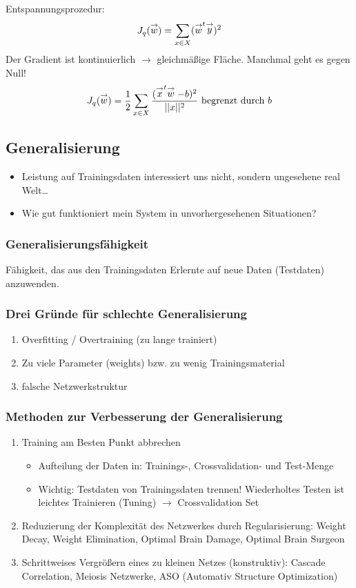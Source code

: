 Entspannungsprozedur: $$J_q(\stackrel{\to}{w}) = \sum\limits_{x \in X} (\stackrel{\to}{w}^t \stackrel{\to}{y})^2$$
Der Gradient ist kontinuierlich $\to$ gleichmäßige Fläche. Manchmal geht es gegen Null!
$$J_q(\stackrel{\to}{w}) = \frac{1}{2} \sum\limits_{x \in X} \frac{(\stackrel{\to}{x}^t\stackrel{\to}{w} - b)^2}{||x||^2} \textrm{ begrenzt durch } b$$

\subsection{Generalisierung}

\begin{itemize}
\item Leistung auf Trainingsdaten interessiert uns nicht, sondern ungesehene real Welt\dots
\item Wie gut funktioniert mein System in unvorhergesehenen Situationen?
\end{itemize}

\subsubsection*{Generalisierungsfähigkeit}

Fähigkeit, das aus den Trainingsdaten Erlernte auf neue Daten (Testdaten) anzuwenden.

\subsubsection*{Drei Gründe für schlechte Generalisierung}
\begin{enumerate}
\item Overfitting / Overtraining (zu lange trainiert)
\item Zu viele Parameter (weights) bzw. zu wenig Trainingsmaterial
\item falsche Netzwerkstruktur
\end{enumerate}
\subsubsection*{Methoden zur Verbesserung der Generalisierung}

\begin{enumerate}
\item Training am Besten Punkt abbrechen
\begin{itemize}
\item Aufteilung der Daten in: Trainings-, Crossvalidation- und Test-Menge
\item Wichtig: Testdaten von Trainingsdaten trennen! Wiederholtes Testen ist leichtes Trainieren (Tuning) $\to$ Crossvalidation Set
\end{itemize}
\item Reduzierung der Komplexität des Netzwerkes durch Regularisierung: Weight Decay, Weight Elimination, Optimal Brain Damage, Optimal Brain Surgeon
\item Schrittweises Vergrößern eines zu kleinen Netzes (konstruktiv): Cascade Correlation, Meiosis Netzwerke, ASO (Automativ Structure Optimization)
\end{enumerate}





